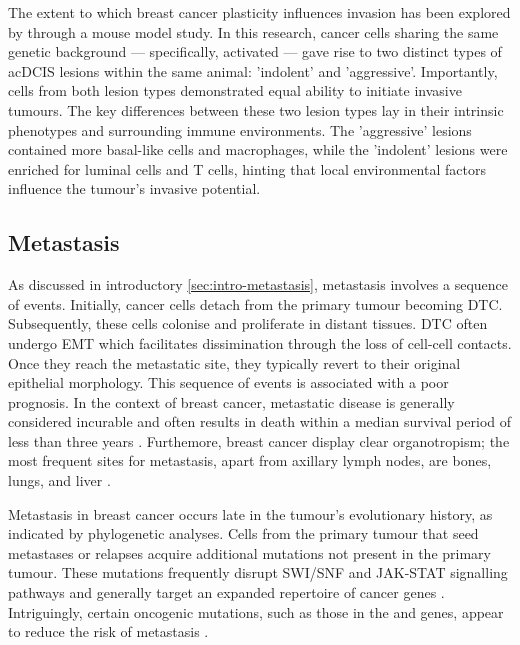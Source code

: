 The extent to which breast cancer plasticity influences invasion has been explored by \textcite{Sinha2021-mf} through a mouse model study. In this research, cancer cells sharing the same genetic background — specifically, activated  — gave rise to two distinct types of ac{DCIS} lesions within the same animal: 'indolent' and 'aggressive'. Importantly, cells from both lesion types demonstrated equal ability to initiate invasive tumours. The key differences between these two lesion types lay in their intrinsic phenotypes and surrounding immune environments. The 'aggressive' lesions contained more basal-like cells and macrophages, while the 'indolent' lesions were enriched for luminal cells and T cells, hinting that local environmental factors influence the tumour's invasive potential.

\subsection{Metastasis}

As discussed in introductory \cref{sec:intro-metastasis}, metastasis involves a sequence of events. Initially, cancer cells detach from the primary tumour becoming \acf{DTC}. Subsequently, these cells colonise and proliferate in distant tissues. \ac{DTC} often undergo \ac{EMT} which facilitates dissimination through the loss of cell-cell contacts. Once they reach the metastatic site, they typically revert to their original epithelial morphology. This sequence of events is associated with a poor prognosis. In the context of breast cancer, metastatic disease is generally considered incurable and often results in death within a median survival period of less than three years \parencite{Harbeck2019-jx}. Furthemore, breast cancer display clear organotropism; the most frequent sites for metastasis, apart from axillary lymph nodes, are bones, lungs, and liver \parencite{Nguyen2022-jr}.

Metastasis in breast cancer occurs late in the tumour's evolutionary history, as indicated by phylogenetic analyses. Cells from the primary tumour that seed metastases or relapses acquire additional mutations not present in the primary tumour. These mutations frequently disrupt SWI/SNF and JAK-STAT signalling pathways and generally target an expanded repertoire of cancer genes \parencite{Yates2017-xc}. Intriguingly, certain oncogenic mutations, such as those in the  and  genes, appear to reduce the risk of metastasis \parencite{Nguyen2022-jr}. 

